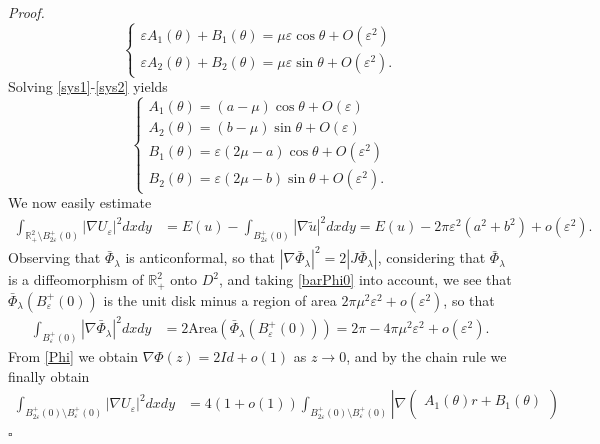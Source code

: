 \documentclass[12pt, a4paper]{article}
\newenvironment{proof}{\noindent\emph{Proof.}}{\hfill$\square$\medskip}
\newcommand{\sph}{\mathbb{S}}
\newcommand{\R}{\mathbb{R}}
\newcommand{\ve}{\varepsilon}
\newcommand{\blu}[1]{{\color{blue}#1}}
\renewcommand{\(}{\left(}
\renewcommand{\)}{\right)}
\begin{document}
\begin{proof}
\begin{equation}\label{sys2}
\begin{cases}
\ve A_1(\theta)+B_1(\theta)=\mu\ve\cos\theta+O(\ve^2)\\
\ve A_2(\theta)+B_2(\theta)=\mu\ve\sin\theta+O(\ve^2).
\end{cases}
\end{equation}
Solving \eqref{sys1}-\eqref{sys2} yields
\begin{equation}\label{AB}
\begin{cases}
A_1(\theta)=(a-\mu)\cos\theta+O(\ve)\\
A_2(\theta)=(b-\mu)\sin\theta+O(\ve)\\
B_1(\theta)=\ve(2\mu-a)\cos\theta+O(\ve^2)\\
B_2(\theta)=\ve(2\mu-b)\sin\theta+O(\ve^2).
\end{cases}
\end{equation}
We now easily estimate
\begin{equation}\label{est1}
\begin{split}
\int_{\R^2_+\setminus B_{2\ve}^+(0)}|\nabla U_\ve|^2dxdy&= E(u)-\int_{B_{2\ve}^+(0)}|\nabla \tilde u|^2dxdy=E(u)-2\pi\ve^2(a^2+b^2)+o(\ve^2).
\end{split}
\end{equation}
Observing that $\bar\Phi_\lambda$ is anticonformal, so that $|\nabla\bar\Phi_\lambda|^2=2|J\bar\Phi_\lambda|$, considering that $\bar\Phi_\lambda$ is a diffeomorphism of $\R^2_+$ onto $D^2$, and taking \eqref{barPhi0} into account, we see that $\bar\Phi_\lambda(B_\ve^+(0))$ is the unit disk minus a region of area $2\pi\mu^2\ve^2+o(\ve^2)$, so that
\begin{equation}\label{est2}
\begin{split}
\int_{B_\ve^+(0)}|\nabla\bar\Phi_\lambda|^2dxdy&=2\mathrm{Area}\(\bar\Phi_\lambda(B_\ve^+(0))\) =2\pi-4\pi\mu^2\ve^2+o(\ve^2).
\end{split}
\end{equation}
From \eqref{Phi} we obtain $\nabla\Phi(z)= 2Id+o(1)$ as $z\to 0$, and by the chain rule
we finally obtain %
\begin{equation}\label{est3}
\begin{split}
\int_{B_{2\ve}^+(0)\setminus B_\ve^+(0)} |\nabla U_\ve|^2dxdy&=4(1+o(1))\int_{B_{2\ve}^+(0)\setminus B_\ve^+(0)}\left|\nabla \begin{pmatrix}
A_1(\theta)r+B_1(\theta)\\

\end{pmatrix}
\end{split}
\end{equation}
\end{proof}
\end{document}
